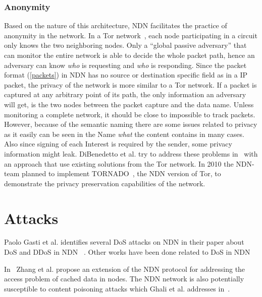 \subsubsection{Anonymity}
Based on the nature of this architecture, \gls{NDN} facilitates the practice of anonymity in the network. 
In a Tor network~\cite{DBLP:conf/uss/DingledineMS04}, each node participating in a circuit only knows the two neighboring nodes.
Only a ``global passive adversary'' that can monitor the entire network is able to decide the whole packet path, hence an adversary can know \textit{who} is requesting and \textit{who} is responding.
Since the packet format (\autoref{packets}) in \gls{NDN} has no source or destination specific field as in a \gls{IP} packet, the privacy of the network is more similar to a Tor network.
If a packet is captured at any arbitrary point of its path, the only information an adversary will get, is the two nodes between the packet capture and the data name. 
Unless monitoring a complete network, it should be close to impossible to track packets.  
However, because of the semantic naming there are some issues related to privacy as it easily can be seen in the Name \textit{what} the content contains in many cases.
Also since signing of each Interest is required by the sender, some privacy information might leak.
DiBenedetto et al. try to address these problems in~\cite{DBLP:conf/ndss/DiBenedettoGTU12} with an approach that use existing solutions from the Tor network.
In 2010 the \gls{NDN}-team planned to implement TORNADO~\cite[Section 3.7]{NDN-0001}, the \gls{NDN} version of Tor, to demonstrate the privacy preservation capabilities of the network.


\section{Attacks}

Paolo Gasti et al. identifies several \gls{DoS} attacks on \gls{NDN} in their paper about \gls{DoS} and \gls{DDoS} in \gls{NDN} ~\cite{DBLP:conf/icccn/GastiTU013}. 
Other works have been done related to \gls{DoS} in \gls{NDN}~\cite{DBLP:journals/ijcomsys/WangCZQZ14, DBLP:conf/ancs/SoNO13, DBLP:journals/corr/abs-1303-4823}

In~\cite{DBLP:journals/tifs/LiZZSF15} Zhang et al. propose an extension of the \gls{NDN} protocol for addressing the access problem of cached data in nodes.  
The \gls{NDN} network is also potentially susceptible to content poisoning attacks which Ghali et al. addresses in~\cite{DBLP:journals/ccr/GhaliTU14}.

